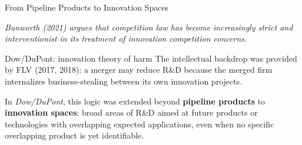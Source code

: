 \documentclass[10pt, aspectratio=169]{beamer}
\begin{document}
\begin{frame}{From Pipeline Products to Innovation Spaces}
\small

\begin{center}
\textit{Bunworth (2021) argues that competition law has become increasingly strict and interventionist in its treatment of innovation competition concerns.}
\end{center}

\vspace{0.5em}

\begin{center}
\end{center}

\vspace{0.7em}

\begin{alertblock}{Dow/DuPont: innovation theory of harm}
\footnotesize
The intellectual backdrop was provided by FLV (2017, 2018): a merger may reduce R\&D because the merged firm internalizes business-stealing between its own innovation projects.

\vspace{0.3em}
In \textit{Dow/DuPont}, this logic was extended beyond \textbf{pipeline products} to \textbf{innovation spaces}: broad areas of R\&D aimed at future products or technologies with overlapping expected applications, even when no specific overlapping product is yet identifiable.
\end{alertblock}

\end{frame}
\end{document}
